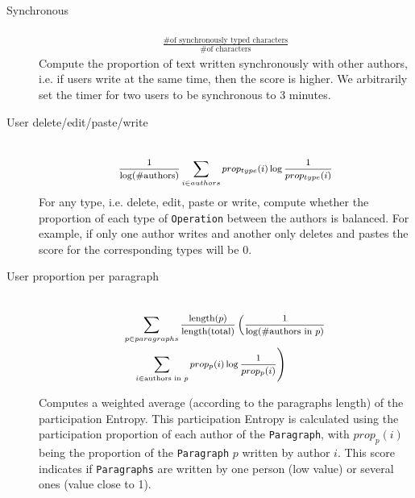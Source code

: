 \documentclass[a4, twocolumn, 12pt]{article}
\begin{document}
\begin{description}
\item [Synchronous]
\begin{align*}
\\
    \frac{\text{\# of synchronously typed characters}}{\text{\# of characters}}
\end{align*}
Compute the proportion of text written synchronously with other authors, i.e. if users write at the same time, then the score is higher. We arbitrarily set the timer for two users to be synchronous to 3 minutes.
\item [User delete/edit/paste/write] 
\begin{align*}
\\
    \medmath{\frac{1}{\log (\text{\#authors)}}\sum_{i \in authors} prop_{type}(i)\log \frac{1}{prop_{type}(i)}}
\end{align*}
For any type, i.e. delete, edit, paste or write, compute whether the proportion of each type of \texttt{Operation} between the authors is balanced. For example, if only one author writes and another only deletes and pastes the score for the corresponding types will be 0.
\item [User proportion per paragraph] 
\begin{align*}
\\
\begin{split}
    & \medmath{\sum_{p \in paragraphs }\frac{\text{length($p$)}}{\text{length(total)}}\left(\frac{1}{\log (\text{\#authors in $p$)}} \right.}\\
    & \medmath{\left. \quad \sum_{i \in \text{authors in $p$}} prop_p(i)\log \frac{1}{prop_p(i)}\right)}
\end{split}
\end{align*}

Computes a weighted average (according to the paragraphs length) of the participation Entropy. This participation Entropy is calculated using the participation proportion of each author of the \texttt{Paragraph}, with $prop_p(i)$ being the proportion of the \texttt{Paragraph} $p$ written by author $i$. This score indicates if \texttt{Paragraphs} are written by one person (low value) or several ones (value close to 1).
\end{description}
\end{document}
